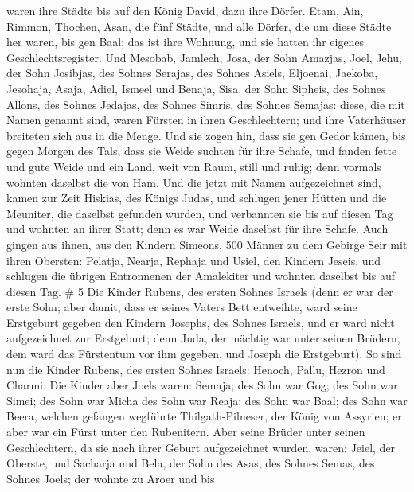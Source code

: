 waren ihre Städte bis auf den König David, dazu ihre Dörfer.
 Etam, Ain, Rimmon, Thochen, Asan, die fünf Städte,
 und alle Dörfer, die um diese Städte her waren, bis gen
Baal; das ist ihre Wohnung, und sie hatten ihr eigenes
Geschlechtsregister.  Und Mesobab, Jamlech, Josa, der Sohn
Amazjas,  Joel, Jehu, der Sohn Josibjas, des Sohnes
Serajas, des Sohnes Asiels,  Eljoenai, Jaekoba, Jesohaja,
Asaja, Adiel, Ismeel und Benaja,  Sisa, der Sohn Sipheis,
des Sohnes Allons, des Sohnes Jedajas, des Sohnes Simris, des Sohnes
Semajas:  diese, die mit Namen genannt sind, waren Fürsten
in ihren Geschlechtern; und ihre Vaterhäuser breiteten sich aus in die
Menge.  Und sie zogen hin, dass sie gen Gedor kämen, bis
gegen Morgen des Tals, dass sie Weide suchten für ihre Schafe,
 und fanden fette und gute Weide und ein Land, weit von
Raum, still und ruhig; denn vormals wohnten daselbst die von Ham.
 Und die jetzt mit Namen aufgezeichnet sind, kamen zur Zeit
Hiskias, des Königs Judas, und schlugen jener Hütten und die Meuniter,
die daselbst gefunden wurden, und verbannten sie bis auf diesen Tag und
wohnten an ihrer Statt; denn es war Weide daselbst für ihre Schafe.
 Auch gingen aus ihnen, aus den Kindern Simeons, 500 Männer
zu dem Gebirge Seir mit ihren Obersten: Pelatja, Nearja, Rephaja und
Usiel, den Kindern Jeseis,  und schlugen die übrigen
Entronnenen der Amalekiter und wohnten daselbst bis auf diesen Tag. \# 5
 Die Kinder Rubens, des ersten Sohnes Israels (denn er war
der erste Sohn; aber damit, dass er seines Vaters Bett entweihte, ward
seine Erstgeburt gegeben den Kindern Josephs, des Sohnes Israels, und er
ward nicht aufgezeichnet zur Erstgeburt;  denn Juda, der
mächtig war unter seinen Brüdern, dem ward das Fürstentum vor ihm
gegeben, und Joseph die Erstgeburt).  So sind nun die Kinder
Rubens, des ersten Sohnes Israels: Henoch, Pallu, Hezron und Charmi.
 Die Kinder aber Joels waren: Semaja; des Sohn war Gog; des
Sohn war Simei;  des Sohn war Micha des Sohn war Reaja; des
Sohn war Baal;  des Sohn war Beera, welchen gefangen
wegführte Thilgath-Pilneser, der König von Assyrien; er aber war ein
Fürst unter den Rubenitern.  Aber seine Brüder unter seinen
Geschlechtern, da sie nach ihrer Geburt aufgezeichnet wurden, waren:
Jeiel, der Oberste, und Sacharja  und Bela, der Sohn des
Asas, des Sohnes Semas, des Sohnes Joels; der wohnte zu Aroer und bis
